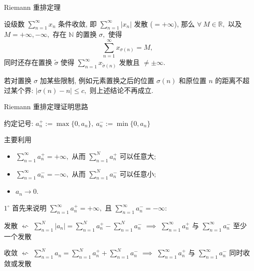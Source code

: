 
\begin{frame}{Riemann 重排定理}

设级数 $\sum\limits_{n=1}^{\infty} x_n$ 条件收敛, 即 $\sum\limits_{n=1}^{\infty} |x_n|$ 发散 ($= + \infty$), 那么 $\forall ~ M \in \mathbb{R},$ 以及 $M = +\infty, -\infty,$ 存在 $\mathbb{N}$ 的置换 $\sigma,$ 使得
\[\sum\limits_{n=1}^{\infty} x_{\sigma(n)} = M,\]
同时还存在置换 $\widetilde{\sigma}$ 使得 $\sum\limits_{n=1}^{\infty} x_{\widetilde{\sigma}(n)}$ 发散且 $\neq \pm\infty.$

\pause
\vspace*{1em}

\begin{attnblock}
若对置换 $\sigma$ 加某些限制, 例如元素置换之后的位置 $\sigma(n)$ 和原位置 $n$ 的距离不超过某个界: $|\sigma(n) - n| \leqslant c,$ 则上述结论不再成立.
\end{attnblock}

\end{frame}


\begin{frame}{Riemann 重排定理证明思路}

约定记号: $a_n^+ := \max\{0, a_n\}, ~ a_n^- := \min\{0, a_n\}$

\begin{block}{主要利用}
\begin{itemize}
\item $\sum\limits_{n=1}^{\infty} a_n^+ = + \infty,$ 从而 $\sum\limits_{n=1}^{N} a_n^+$ 可以任意大;
\item $\sum\limits_{n=1}^{\infty} a_n^- = - \infty,$ 从而 $\sum\limits_{n=1}^{N} a_n^-$ 可以任意小;
\item $a_n \to 0.$
\end{itemize}
\end{block}

\pause

$1^{\circ}$ 首先来说明 $\sum\limits_{n=1}^{\infty} a_n^+ = + \infty,$ 且 $\sum\limits_{n=1}^{\infty} a_n^- = - \infty:$

{\smaller
发散 $\leftsquigarrow$ $\sum\limits_{n=1}^{N} |a_n| = \sum\limits_{n=1}^{N} a_n^+ - \sum\limits_{n=1}^{N} a_n^-$ $\implies$ $\sum\limits_{n=1}^{\infty} a_n^+$ 与 $\sum\limits_{n=1}^{\infty} a_n^-$ \alert{至少一个发散}

收敛 $\leftsquigarrow$ $\sum\limits_{n=1}^{N} a_n = \sum\limits_{n=1}^{N} a_n^+ + \sum\limits_{n=1}^{N} a_n^-$ $\implies$ $\sum\limits_{n=1}^{\infty} a_n^+$ 与 $\sum\limits_{n=1}^{\infty} a_n^-$ \alert{同时收敛或发散}
}

\end{frame}

